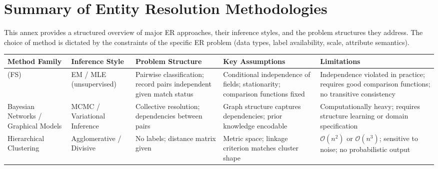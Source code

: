 \section{Summary of Entity Resolution Methodologies}
\label{annex:er_methodologies}

This annex provides a structured overview of major ER approaches, their inference styles, and the problem structures they address.
The choice of method is dictated by the constraints of the specific ER problem (data types, label availability, scale, attribute semantics).

\begin{longtable}{p{2.5cm}p{2.5cm}p{3.5cm}p{3.5cm}p{3.5cm}}
	\toprule
	\textbf{Method Family}                           & \textbf{Inference Style}             & \textbf{Problem Structure}                                           & \textbf{Key Assumptions}                                                               & \textbf{Limitations}                                                                             \\
	\midrule
	\endhead

	\fellegisunter{} (FS)                            & EM / MLE (unsupervised)              & Pairwise classification; record pairs independent given match status & Conditional independence of fields; stationarity; comparison functions fixed           & Independence violated in practice; requires good comparison functions; no transitive consistency \\

	Bayesian Networks / Graphical Models             & MCMC / Variational Inference         & Collective resolution; dependencies between pairs                    & Graph structure captures dependencies; prior knowledge encodable                       & Computationally heavy; requires structure learning or domain specification                       \\

	Hierarchical Clustering                          & Agglomerative / Divisive             & No labels; distance matrix given                                     & Metric space; linkage criterion matches cluster shape                                  & $\mathcal{O}(n^2)$ or $\mathcal{O}(n^3)$; sensitive to noise; no probabilistic output            \\


\end{longtable}

